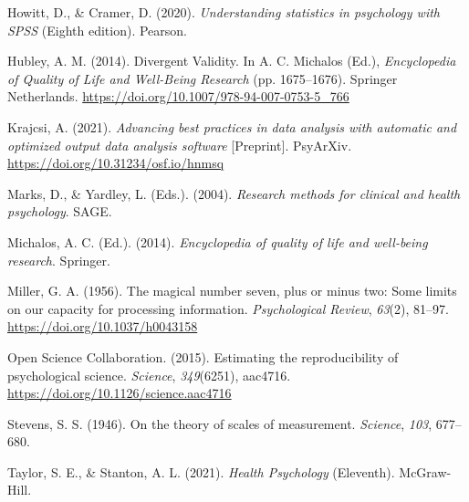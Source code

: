\documentclass[
  11pt,
  a4paper,
  twoside,symmetric,openright]{book}
\newlength{\cslhangindent}
\newlength{\cslentryspacingunit} %
\newenvironment{CSLReferences}[2] %
 {%
  \setlength{\parindent}{0pt}
  \ifodd #1
  \let\oldpar\par
  \def\par{\hangindent=\cslhangindent\oldpar}
  \fi
  \setlength{\parskip}{#2\cslentryspacingunit}
 }%
 {}
\theoremstyle{break}
\theoremstyle{break}
\begin{document}
\begin{CSLReferences}{1}{0}
\leavevmode{}%
Howitt, D., \& Cramer, D. (2020). \emph{Understanding statistics in psychology with {SPSS}} (Eighth edition). {Pearson}.

\leavevmode{}%
Hubley, A. M. (2014). Divergent {Validity}. In A. C. Michalos (Ed.), \emph{Encyclopedia of {Quality} of {Life} and {Well-Being Research}} (pp. 1675--1676). {Springer Netherlands}. \url{https://doi.org/10.1007/978-94-007-0753-5_766}

\leavevmode{}%
Krajcsi, A. (2021). \emph{Advancing best practices in data analysis with automatic and optimized output data analysis software} {[}Preprint{]}. PsyArXiv. \url{https://doi.org/10.31234/osf.io/hnmsq}

\leavevmode{}%
Marks, D., \& Yardley, L. (Eds.). (2004). \emph{Research methods for clinical and health psychology}. {SAGE}.

\leavevmode{}%
Michalos, A. C. (Ed.). (2014). \emph{Encyclopedia of quality of life and well-being research}. {Springer}.

\leavevmode{}%
Miller, G. A. (1956). The magical number seven, plus or minus two: {Some} limits on our capacity for processing information. \emph{Psychological Review}, \emph{63}(2), 81--97. \url{https://doi.org/10.1037/h0043158}

\leavevmode{}%
Open Science Collaboration. (2015). Estimating the reproducibility of psychological science. \emph{Science}, \emph{349}(6251), aac4716. \url{https://doi.org/10.1126/science.aac4716}

\leavevmode{}%
Stevens, S. S. (1946). On the theory of scales of measurement. \emph{Science}, \emph{103}, 677--680.

\leavevmode{}%
Taylor, S. E., \& Stanton, A. L. (2021). \emph{Health {Psychology}} (Eleventh). {McGraw-Hill}.

\end{CSLReferences}
\end{document}
